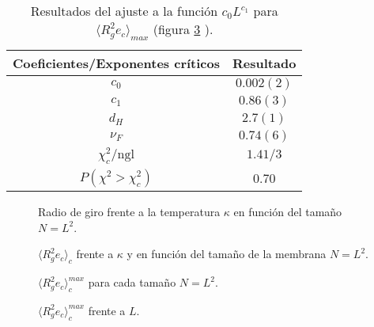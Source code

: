 \begin{table}[h]
\centering
\begin{tabular}{|c|c|}\hline
 Coeficientes/Exponentes críticos & Resultado \\\hline
 $c_0$         & $0.002(2) $ \\ \hline
 $c_1$         & $0.86(3)$ \\ \hline
$d_H$      & $2.7(1)$ \\ \hline
$\nu_F $        & $0.74(6)$ \\ \hline
$\chi_c^2/\mathrm{ngl}$ &  $1.41/3$   \\ \hline
 $P(\chi^2>\chi_c^2)$&  $0.70$\\ \hline
\end{tabular}
\caption{Resultados del ajuste a la función $c_0L^{c_1}$ para $\langle R_g^2
  e_c\rangle_{max}$ (figura \ref{max_varradio-giro-fig} ).}\label{max_varradio-giro-tab}
\end{table}

\begin{figure}[h]
  \centering
  
  \caption{Radio de giro frente a la temperatura $\kappa$ en función del tamaño $N=L^2$.}\label{radio-giro-fig}
\end{figure}

\begin{figure}[h]
  \centering
  
  \caption{$\langle R_g^2e_c\rangle_c$ frente a $\kappa$ y en función
    del tamaño de la membrana $N=L^2$.}\label{varradio-giro-fig}
\end{figure}

\begin{figure}[h]
  \centering
  
  \caption{$\langle R_g^2e_c\rangle^{max}_c$ para cada tamaño $N=L^2$.}\label{max_varradio-giro-fig}
\end{figure}

\begin{figure}[h]
  \centering
  
  \caption{$\langle R_g^2 e_c\rangle^{max}_c$ frente a $L$.}\label{max_varradio-giro-L-fig}
\end{figure}

%  
\clearpage
